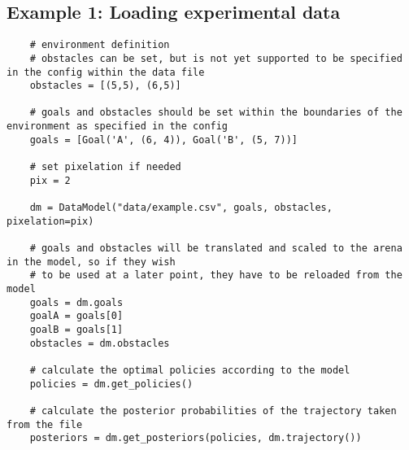 \subsection{Example 1: Loading experimental data}\label{appendix:ex_loading}
\begin{verbatim}
	# environment definition
	# obstacles can be set, but is not yet supported to be specified in the config within the data file
	obstacles = [(5,5), (6,5)]
	
	# goals and obstacles should be set within the boundaries of the environment as specified in the config
	goals = [Goal('A', (6, 4)), Goal('B', (5, 7))]
	
	# set pixelation if needed
	pix = 2
	
	dm = DataModel("data/example.csv", goals, obstacles, pixelation=pix)

	# goals and obstacles will be translated and scaled to the arena in the model, so if they wish
	# to be used at a later point, they have to be reloaded from the model
	goals = dm.goals
	goalA = goals[0]
	goalB = goals[1]
	obstacles = dm.obstacles
	
	# calculate the optimal policies according to the model
	policies = dm.get_policies()
	
	# calculate the posterior probabilities of the trajectory taken from the file
	posteriors = dm.get_posteriors(policies, dm.trajectory())

	
\end{verbatim}
